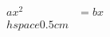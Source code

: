 \documentclass[preview]{standalone}
\begin{document}
\begin{align*}
ax^2 &= bx\\hspace{0.5cm}
\end{align*}
\end{document}
